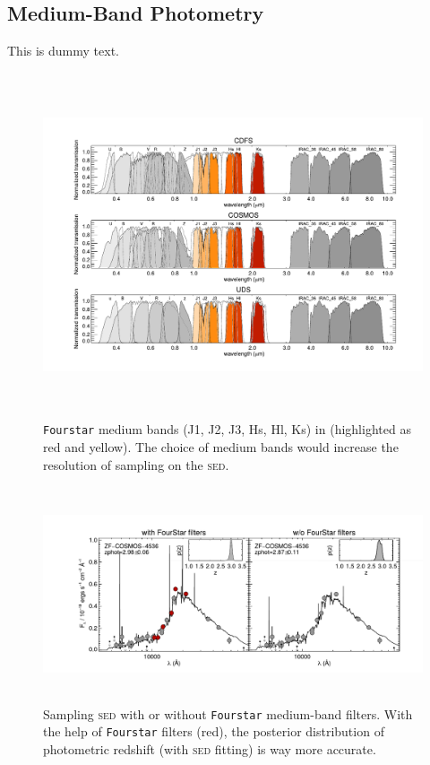 \documentclass{ar-1col}
\begin{document}
\subsection{Medium-Band Photometry}
This is dummy text. 

\begin{figure}
    \includegraphics[width=6in, height=4in]{images/medium_bands.pdf}
    \caption{\texttt{Fourstar} medium bands (J1, J2, J3, Hs, Hl, Ks) in \citet{Straatman2016} (highlighted as red and yellow). The choice of medium bands would increase the resolution of sampling on the \textsc{sed}.}
\end{figure}

\begin{figure}
    \includegraphics[width=6in, height=2.5in]{images/z_photo_better.pdf}
    \caption{Sampling \textsc{sed} with or without \texttt{Fourstar} medium-band filters. With the help of \texttt{Fourstar} filters (red), the posterior distribution of photometric redshift (with \textsc{sed} fitting) is way more accurate.}
\end{figure}
\end{document}
